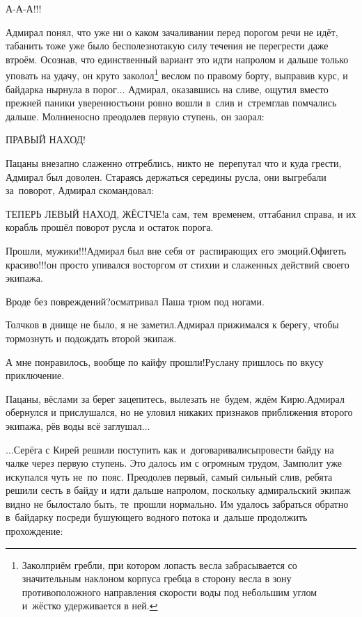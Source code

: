\diagdash А-А-А!!!

\renewcommand*{\thefootnote}{\fnsymbol{footnote}}
\setcounter{footnote}{0}
Адмирал понял, что уже ни о каком зачаливании перед порогом речи не идёт, табанить тоже уже было бесполезно\mdash такую силу течения не перегрести даже втроём. Осознав, что единственный вариант это идти напролом и дальше только уповать на удачу, он круто заколол\footnote{Закол\mdash приём гребли, при котором лопасть весла забрасывается со значительным наклоном корпуса гребца в сторону весла в зону противоположного направления скорости воды под небольшим углом и~жёстко удерживается в ней.} веслом по правому борту, выправив курс, и байдарка нырнула в порог$\ldots$ Адмирал, оказавшись на сливе, ощутил вместо прежней паники уверенность\mdash они ровно вошли в~слив и~стремглав помчались дальше. Молниеносно преодолев первую ступень, он заорал:

\diagdash ПРАВЫЙ НАХОД!

Пацаны внезапно слаженно отгреблись, никто не~перепутал что и куда грести, Адмирал был доволен. Стараясь держаться середины русла, они выгребали за~поворот, Адмирал скомандовал:

\diagdash ТЕПЕРЬ ЛЕВЫЙ НАХОД, ЖЁСТЧЕ!\mdash а сам, тем~временем, оттабанил справа, и их корабль прошёл поворот русла и остаток порога.

\diagdash Прошли, мужики!!!\mdash Адмирал был вне себя от~распирающих его эмоций.\mdash Офигеть красиво!!!\mdash он просто упивался восторгом от стихии и слаженных действий своего экипажа.

\diagdash Вроде без повреждений?\mdash осматривал Паша трюм под ногами.

\diagdash Толчков в днище не было, я не заметил.\mdash Адмирал прижимался к берегу, чтобы тормознуть и подождать второй экипаж.

\diagdash А мне понравилось, вообще по кайфу прошли!\mdash Руслану пришлось по вкусу приключение.

\diagdash Пацаны, вёслами за берег зацепитесь, вылезать не~будем, ждём Кирю.\mdash Адмирал обернулся и прислушался, но не уловил никаких признаков приближения второго экипажа, рёв воды всё заглушал$\ldots$

\vspace{0.5cm}
$\ldots$Серёга с Кирей решили поступить как и~договаривались\mdash провести байду на чалке через первую ступень. Это далось им с огромным трудом, Замполит уже искупался чуть не~по~пояс. Преодолев первый, самый сильный слив, ребята решили сесть в байду и идти дальше напролом, поскольку адмиральский экипаж видно не было\mdash стало быть, те~прошли нормально. Им удалось забраться обратно в~байдарку посреди бушующего водного потока и~дальше продолжить прохождение:

